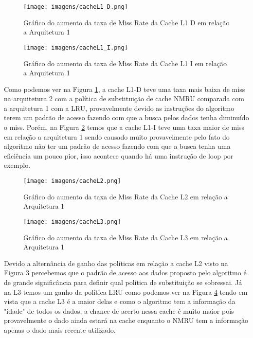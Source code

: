 \documentclass[12pt]{article}
\begin{document}
\begin{figure}[H]
\centering
\texttt{[image: imagens/cacheL1\_D.png]}
\caption{Gráfico do aumento da taxa de Miss Rate da Cache L1 D em relação a Arquitetura 1}
\label{fig:figura1}
\end{figure}

\begin{figure}[H]
\centering
\texttt{[image: imagens/cacheL1\_I.png]}
\caption{Gráfico do aumento da taxa de Miss Rate da Cache L1 I em relação a Arquitetura 1}
\label{fig:figura2}
\end{figure}

Como podemos ver na Figura \ref{fig:figura1}, a cache L1-D teve uma taxa mais baixa de miss na arquitetura 2 com a política de substituição de cache NMRU comparada com a arquitetura 1 com a LRU, provavelmente devido as instruções do algoritmo terem um padrão de acesso fazendo com que a busca pelos dados tenha diminuído o miss. Porém, na Figura \ref{fig:figura2} temos que a cache L1-I teve uma taxa maior de miss em relação a arquitetura 1 sendo causado muito provavelmente pelo fato do algoritmo não ter um padrão de acesso fazendo com que a busca tenha uma eficiência um pouco pior, isso acontece quando há uma instrução de loop por exemplo.

\begin{figure}[H]
\centering
\texttt{[image: imagens/cacheL2.png]}
\caption{Gráfico do aumento da taxa de Miss Rate da Cache L2 em relação a Arquitetura 1}
\label{fig:figura3}
\end{figure}

\begin{figure}[H]
\centering
\texttt{[image: imagens/cacheL3.png]}
\caption{Gráfico do aumento da taxa de Miss Rate da Cache L3 em relação a Arquitetura 1}
\label{fig:figura4}
\end{figure}

Devido a alternância de ganho das políticas em relação a cache L2 visto na Figura \ref{fig:figura3} percebemos que o padrão de acesso aos dados proposto pelo algoritmo é de grande significância para definir qual política de substituição se sobressai. Já na L3 temos um ganho da política LRU como podemos ver na Figura \ref{fig:figura4} tendo em vista que a cache L3 é a maior delas e como o algoritmo tem a informação da "idade" de todos os dados, a chance de acerto nessa cache é muito maior pois provavelmente o dado ainda estará na cache enquanto o NMRU tem a informação apenas o dado mais recente utilizado.
\end{document}
